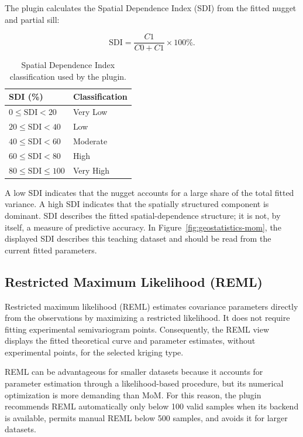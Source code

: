 \documentclass[11pt,a4paper]{article}
\begin{document}
The plugin calculates the Spatial Dependence Index (SDI) from the fitted nugget and partial sill:

\[
    \mathrm{SDI}=\frac{C1}{C0+C1}\times 100\%.
\]

\begin{table}[H]
    \centering
    \caption{Spatial Dependence Index classification used by the plugin.}
    \label{tab:sdi-classification}
    \begin{tabular}{ll}
        \toprule
        \textbf{SDI (\%)} & \textbf{Classification} \\
        \midrule
        $0 \leq \mathrm{SDI} < 20$ & Very Low \\
        $20 \leq \mathrm{SDI} < 40$ & Low \\
        $40 \leq \mathrm{SDI} < 60$ & Moderate \\
        $60 \leq \mathrm{SDI} < 80$ & High \\
        $80 \leq \mathrm{SDI} \leq 100$ & Very High \\
        \bottomrule
    \end{tabular}
\end{table}

A low SDI indicates that the nugget accounts for a large share of the total fitted variance. A high SDI indicates that the spatially structured component is dominant. SDI describes the fitted spatial-dependence structure; it is not, by itself, a measure of predictive accuracy. In Figure~\ref{fig:geostatistics-mom}, the displayed SDI describes this teaching dataset and should be read from the current fitted parameters.

\subsection{Restricted Maximum Likelihood (REML)}

Restricted maximum likelihood (REML) estimates covariance parameters directly from the observations by maximizing a restricted likelihood. It does not require fitting experimental semivariogram points. Consequently, the REML view displays the fitted theoretical curve and parameter estimates, without experimental points, for the selected kriging type.

REML can be advantageous for smaller datasets because it accounts for parameter estimation through a likelihood-based procedure, but its numerical optimization is more demanding than MoM. For this reason, the plugin recommends REML automatically only below 100 valid samples when its backend is available, permits manual REML below 500 samples, and avoids it for larger datasets.
\end{document}

